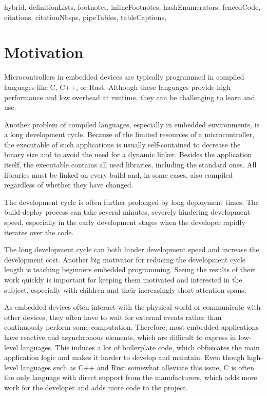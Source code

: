 \begin{markdown*}{%
  hybrid,
  definitionLists,
  footnotes,
  inlineFootnotes,
  hashEnumerators,
  fencedCode,
  citations,
  citationNbsps,
  pipeTables,
  tableCaptions,
}

\chapter{Motivation}

Microcontrollers in embedded devices are typically programmed in compiled languages like C, C++, or Rust. Although these languages provide high performance and low overhead at runtime, they can be challenging to learn and use.

Another problem of compiled languages, especially in embedded environments, is a long development cycle. Because of the limited resources of a microcontroller, the executable of such applications is usually self-contained to decrease the binary size and to avoid the need for a dynamic linker. Besides the application itself, the executable contains all used libraries, including the standard ones. All libraries must be linked on every build and, in some cases, also compiled regardless of whether they have changed.

The development cycle is often further prolonged by long deployment times. The build-deploy process can take several minutes, severely hindering development speed, especially in the early development stages when the developer rapidly iterates over the code.

The long development cycle can both hinder development speed and increase the development cost. Another big motivator for reducing the development cycle length is teaching beginners embedded programming. Seeing the results of their work quickly is important for keeping them motivated and interested in the subject, especially with children and their increasingly short attention spans.

As embedded devices often interact with the physical world or communicate with other devices, they often have to wait for external events rather than continuously perform some computation. Therefore, most embedded applications have reactive and asynchronous elements, which are difficult to express in low-level languages. This induces a lot of boilerplate code, which obfuscates the main application logic and makes it harder to develop and maintain. Even though high-level languages such as C++ and Rust somewhat alleviate this issue, C is often the only language with direct support from the manufacturers, which adds more work for the developer and adds more code to the project.



\end{markdown*}
